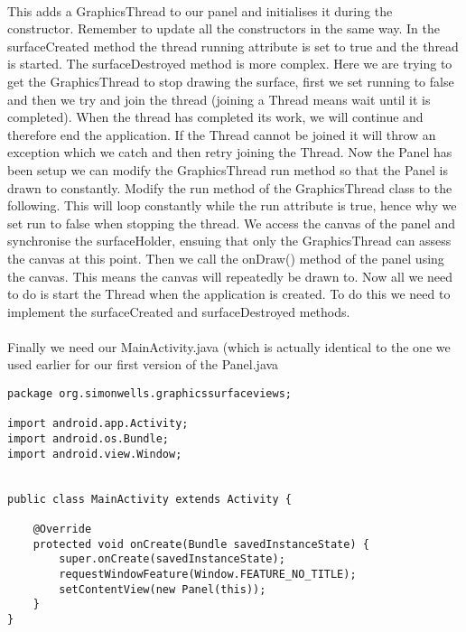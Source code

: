 \paragraph{} This adds a GraphicsThread to our panel and initialises it during the constructor. Remember to update all the constructors in the same way.
In the surfaceCreated method the thread running attribute is set to true and the thread is started. The surfaceDestroyed method is more complex. Here we are trying to get the GraphicsThread to stop drawing the surface, first we set running to false and then we try and join the thread (joining a Thread means wait until it is completed). When the thread has completed its work, we will continue and therefore end the application. If the Thread cannot be joined it will throw an exception which we catch and then retry joining the Thread. Now the Panel has been setup we can modify the GraphicsThread run method so that the Panel is drawn to constantly. Modify the run method of the GraphicsThread class to the following. This will loop constantly while the run attribute is true, hence why we set run to false when stopping the thread. We access the canvas of the panel and synchronise the surfaceHolder, ensuing that only the GraphicsThread can assess the canvas at this point. Then we call the onDraw() method of the panel using the canvas. This means the canvas will repeatedly be drawn to.
Now all we need to do is start the Thread when the application is created. To do this we need to implement the surfaceCreated and surfaceDestroyed methods. 


\paragraph{} Finally we need our MainActivity.java (which is actually identical to the one we used earlier for our first version of the Panel.java

\begin{lstlisting}
package org.simonwells.graphicssurfaceviews;

import android.app.Activity;
import android.os.Bundle;
import android.view.Window;


public class MainActivity extends Activity {

    @Override
    protected void onCreate(Bundle savedInstanceState) {
        super.onCreate(savedInstanceState);
        requestWindowFeature(Window.FEATURE_NO_TITLE);
        setContentView(new Panel(this));
    }
}
\end{lstlisting}

